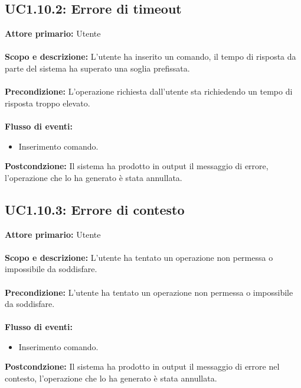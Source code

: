 \documentclass{scalatekids-article}
\begin{document}
\subsection{UC1.10.2: Errore di timeout}
\textbf{Attore primario:} Utente \\ \\
\textbf{Scopo e descrizione:} L'utente ha inserito un comando, il tempo di risposta da parte del sistema ha superato una soglia prefissata.\\ \\
\textbf{Precondizione:} L'operazione richiesta dall'utente sta richiedendo un tempo di risposta troppo elevato.\\ \\
\textbf{Flusso di eventi:}
\begin{itemize}
\item Inserimento comando.
\end{itemize}
\textbf{Postcondzione:} Il sistema ha prodotto in output il messaggio di errore, l'operazione che lo ha generato è stata annullata.
\subsection{UC1.10.3: Errore di contesto}
\textbf{Attore primario:} Utente \\ \\
\textbf{Scopo e descrizione:} L'utente ha tentato un operazione non permessa o impossibile da soddisfare.\\ \\
\textbf{Precondizione:} L'utente ha tentato un operazione non permessa o impossibile da soddisfare.\\ \\
\textbf{Flusso di eventi:}
\begin{itemize}
\item Inserimento comando.
\end{itemize}
\textbf{Postcondzione:} Il sistema ha prodotto in output il messaggio di errore nel contesto, l'operazione che lo ha generato è stata annullata.
\end{document}
